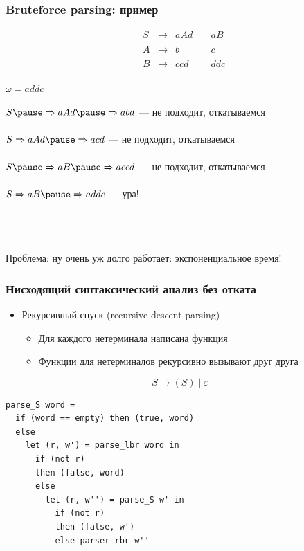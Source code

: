 \documentclass{beamer}
\newcommand{\derives}[0]{\xRightarrow[]{}}
\begin{document}
\begin{frame}[fragile]
  \transwipe[direction=90]
  \frametitle{Bruteforce parsing: пример}

  $$
  \begin{array}{crcccl}
  &S& \rightarrow & a A d & | & a B \\
  &A& \rightarrow & b     & | & c \\
  &B& \rightarrow & c c d & | & d d c
  \end{array}
  $$
  
  $\omega = a d d c$ \pause 
  
  $S \pause \derives a A d \pause \derives a b d$ \pause --- не подходит, откатываемся \pause 
  
  $S \derives a A d \pause \derives a c d$ \pause --- не подходит, откатываемся \pause 
  
  $S \pause \derives a B \pause \derives a c c d$ \pause --- не подходит, откатываемся \pause 
  
  $S \derives a B \pause \derives a d d c$ \pause --- ура!
  
  ~\\~
  
  Проблема: ну очень уж долго работает: экспоненциальное время!
\end{frame}

\begin{frame}[fragile]
  \transwipe[direction=90]
  \frametitle{Нисходящий синтаксический анализ без отката}
  \begin{itemize}
    \item Рекурсивный спуск (recursive descent parsing)
    \begin{itemize}
      \item Для каждого нетерминала написана функция
      \item Функции для нетерминалов рекурсивно вызывают друг друга
    \end{itemize}
  \end{itemize}
  
  $$
  S \rightarrow ( S ) \mid \varepsilon
  $$
  
\begin{verbatim}
parse_S word =
  if (word == empty) then (true, word)
  else  
    let (r, w') = parse_lbr word in
      if (not r) 
      then (false, word)
      else 
        let (r, w'') = parse_S w' in
          if (not r) 
          then (false, w')
          else parser_rbr w''
\end{verbatim}
\end{frame}
\end{document}

